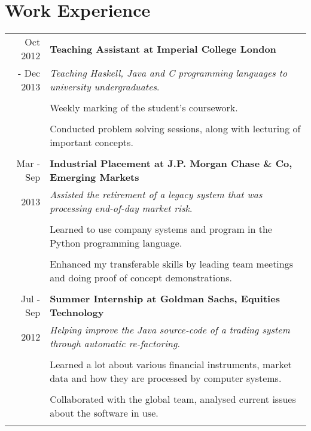 \documentclass[a4paper,10pt]{article} %
\begin{document}
\section*{Work Experience}

\begin{tabular}{r|p{15cm}}
Oct 2012 & \large\textbf{Teaching Assistant at Imperial College London} \\
- Dec 2013 & \emph{Teaching Haskell, Java and C programming languages to university
undergraduates}.\\ 
& \\
& Weekly marking of the student's coursework.\\
& \\
& Conducted problem solving sessions, along with lecturing of important
concepts.\\
\multicolumn{2}{c}{} \\


Mar - Sep & \large\textbf{Industrial Placement at J.P. Morgan Chase \& Co, Emerging
Markets}\\
2013 & \emph{Assisted the retirement of a legacy system that was processing end-of-day
market risk}.\\
& \\
& Learned to use company systems and program in the Python programming language.\\
& \\
& Enhanced my transferable skills by leading team meetings and doing proof of concept demonstrations.\\
\multicolumn{2}{c}{} \\


Jul - Sep & \large\textbf{Summer Internship at Goldman Sachs, Equities Technology}\\
2012 & \emph{Helping improve the Java source-code of a trading system through
automatic re-factoring}.\\
& \\
& Learned a lot about various financial instruments, market data and how they
are processed by computer systems. \\
& \\
& Collaborated with the global team, analysed current issues about the software
in use.\\

\multicolumn{2}{c}{} \\


\end{tabular}
\end{document}
